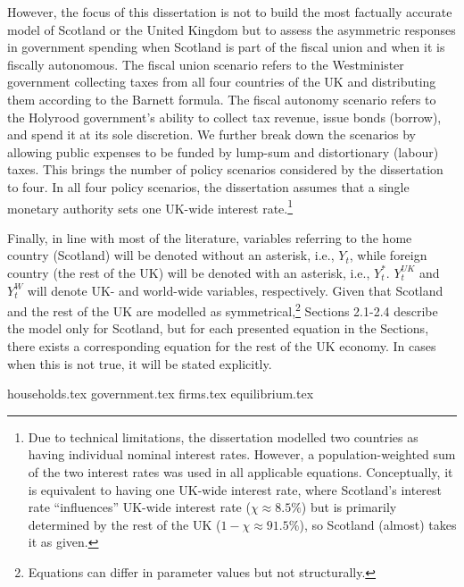 However, the focus of this dissertation is not to build the most factually accurate model of Scotland or the United Kingdom but to assess the asymmetric responses in government spending when Scotland is part of the fiscal union and when it is fiscally autonomous. The fiscal union scenario refers to the Westminister government collecting taxes from all four countries of the UK and distributing them according to the Barnett formula. The fiscal autonomy scenario refers to the Holyrood government's ability to collect tax revenue, issue bonds (borrow), and spend it at its sole discretion. We further break down the scenarios by allowing public expenses to be funded by lump-sum and distortionary (labour) taxes. This brings the number of policy scenarios considered by the dissertation to four. In all four policy scenarios, the dissertation assumes that a single monetary authority sets one UK-wide interest rate.\footnote{Due to technical limitations, the dissertation modelled two countries as having individual nominal interest rates. However, a population-weighted sum of the two interest rates was used in all applicable equations. Conceptually, it is equivalent to having one UK-wide interest rate, where Scotland's interest rate ``influences'' UK-wide interest rate ($\chi \approx 8.5\%$) but is primarily determined by the rest of the UK ($1-\chi \approx 91.5\%$), so Scotland (almost) takes it as given.}

Finally, in line with most of the literature, variables referring to the home country (Scotland) will be denoted without an asterisk, i.e., $Y_t$, while foreign country (the rest of the UK) will be denoted with an asterisk, i.e., $Y^*_t$. $Y_t^{UK}$ and $Y_t^{W}$ will denote UK- and world-wide variables, respectively. Given that Scotland and the rest of the UK are modelled as symmetrical,\footnote{Equations can differ in parameter values but not structurally.} Sections 2.1-2.4 describe the model only for Scotland, but for each presented equation in the Sections, there exists a corresponding equation for the rest of the UK economy. In cases when this is not true, it will be stated explicitly.

\newpage
{households.tex}
\newpage
{government.tex}
\newpage
{firms.tex}
\newpage
{equilibrium.tex}